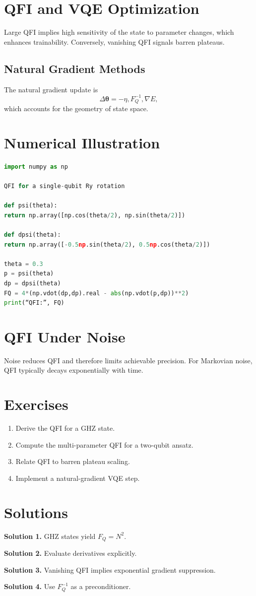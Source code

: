 \documentclass{book}
\begin{document}
\section{QFI and VQE Optimization}

Large QFI implies high sensitivity of the state to parameter changes, which enhances trainability. Conversely, vanishing QFI signals barren plateaus.

\subsection{Natural Gradient Methods}

The natural gradient update is
\begin{equation}
\Delta \bm\theta = - \eta , F_Q^{-1} , \nabla E,
\end{equation}
which accounts for the geometry of state space.

\section{Numerical Illustration}

\begin{lstlisting}[language=Python]
import numpy as np

QFI for a single-qubit Ry rotation

def psi(theta):
return np.array([np.cos(theta/2), np.sin(theta/2)])

def dpsi(theta):
return np.array([-0.5np.sin(theta/2), 0.5np.cos(theta/2)])

theta = 0.3
p = psi(theta)
dp = dpsi(theta)
FQ = 4*(np.vdot(dp,dp).real - abs(np.vdot(p,dp))**2)
print(“QFI:”, FQ)
\end{lstlisting}

\section{QFI Under Noise}

Noise reduces QFI and therefore limits achievable precision. For Markovian noise, QFI typically decays exponentially with time.

\section{Exercises}

\begin{enumerate}
\item Derive the QFI for a GHZ state.
\item Compute the multi-parameter QFI for a two-qubit ansatz.
\item Relate QFI to barren plateau scaling.
\item Implement a natural-gradient VQE step.
\end{enumerate}

\section{Solutions}

\textbf{Solution 1.} GHZ states yield $F_Q = N^2$.

\textbf{Solution 2.} Evaluate derivatives explicitly.

\textbf{Solution 3.} Vanishing QFI implies exponential gradient suppression.

\textbf{Solution 4.} Use $F_Q^{-1}$ as a preconditioner.
\end{document}
